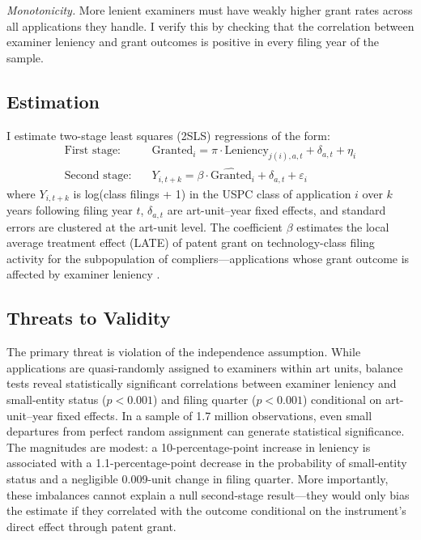 \documentclass[12pt]{article}
\begin{document}
\emph{Monotonicity.} More lenient examiners must have weakly higher grant rates across all applications they handle. I verify this by checking that the correlation between examiner leniency and grant outcomes is positive in every filing year of the sample.

\subsection{Estimation}

I estimate two-stage least squares (2SLS) regressions of the form:
\begin{align}
\text{First stage:} \quad & \text{Granted}_i = \pi \cdot \text{Leniency}_{j(i),a,t} + \delta_{a,t} + \eta_i \\
\text{Second stage:} \quad & Y_{i,t+k} = \beta \cdot \widehat{\text{Granted}}_i + \delta_{a,t} + \varepsilon_i
\end{align}
where $Y_{i,t+k}$ is log(class filings + 1) in the USPC class of application $i$ over $k$ years following filing year $t$, $\delta_{a,t}$ are art-unit--year fixed effects, and standard errors are clustered at the art-unit level. The coefficient $\beta$ estimates the local average treatment effect (LATE) of patent grant on technology-class filing activity for the subpopulation of compliers---applications whose grant outcome is affected by examiner leniency \citep{imbens1994}.

\subsection{Threats to Validity}

The primary threat is violation of the independence assumption. While applications are quasi-randomly assigned to examiners within art units, balance tests reveal statistically significant correlations between examiner leniency and small-entity status ($p < 0.001$) and filing quarter ($p < 0.001$) conditional on art-unit--year fixed effects. In a sample of 1.7 million observations, even small departures from perfect random assignment can generate statistical significance. The magnitudes are modest: a 10-percentage-point increase in leniency is associated with a 1.1-percentage-point decrease in the probability of small-entity status and a negligible 0.009-unit change in filing quarter. More importantly, these imbalances cannot explain a null second-stage result---they would only bias the estimate if they correlated with the outcome conditional on the instrument's direct effect through patent grant.
\end{document}
